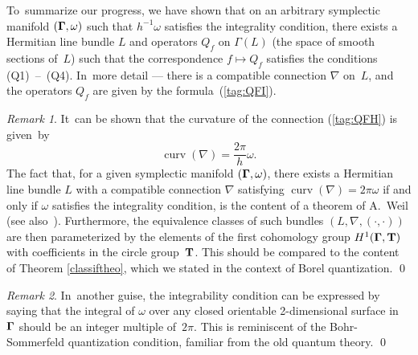 \documentclass[12pt]{amsart}
\numberwithin{equation}{section}
\theoremstyle{remark}
\newtheorem{remark*}{Remark}
\newcommand\TT{{\bold T}}
\newcommand\Omg{{\bigam}}   %
\newcommand\curv{\operatorname{curv}}
\newcommand{\bigam}{\mbox{\boldmath $\Gamma$}}
\begin{document}
To~summarize our progress, we have shown that on an arbitrary symplectic
manifold $(\Omg,\omega)$ such that $h^{-1}\omega$ satisfies the integrality
condition, there exists a Hermitian line bundle $L$ and operators $Q_f$ on
$\Gamma(L)$ (the space of smooth sections of~$L$) such that the correspondence
$f\mapsto Q_f$ satisfies the conditions (Q1)~--~(Q4). In~more detail --- there
is a compatible connection $\nabla$ on~$L$, and the operators $Q_f$ are given
by the formula~(\ref{tag:QFI}).

\begin{remark*} It~can be shown that the curvature of the connection
(\ref{tag:QFH}) is given~by
$$ \curv(\nabla) = \frac{2\pi}h \omega.  $$
The fact that, for a given symplectic manifold $(\Omg,\omega)$, there exists a
Hermitian line bundle $L$ with a compatible connection $\nabla$ satisfying
$\curv(\nabla)=2\pi\omega$ if and only if $\omega$ satisfies the integrality
condition, is the content of a theorem of A.~Weil \cite{bib:WeilVK} (see
also~\cite{bib:Kost}). Furthermore, the equivalence classes of such bundles
$(L,\nabla,(\cdot,\cdot))$ are then parameterized by the elements of the first
cohomology group $H^1(\Omg,\TT)$ with coefficients in the circle group~$\TT$.
This should be compared to the content of Theorem \ref{classiftheo}, which we
stated in the context of Borel quantization.
\qed  \end{remark*}

\begin{remark*} In~another guise, the integrability condition can be expressed
by saying that the integral of $\omega$ over any closed orientable
2-dimensional surface in~$\Omg$ should be an integer multiple of~$2\pi$.
This is reminiscent of the Bohr-Sommerfeld quantization condition,
familiar from the old quantum theory. \qed
\end{remark*}
\end{document}
